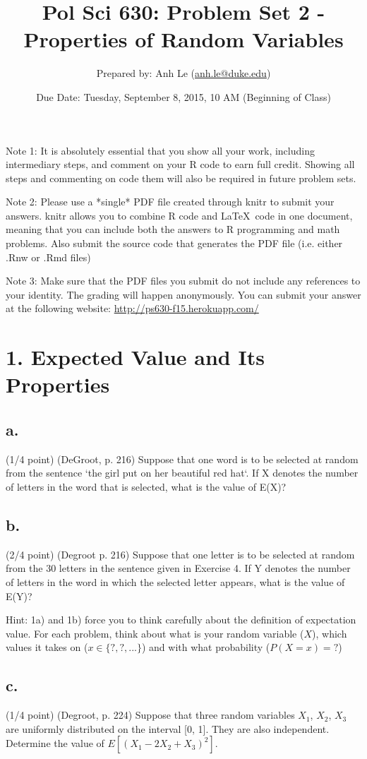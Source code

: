 \documentclass{article}\usepackage[]{graphicx}\usepackage[]{color}
\title{Pol Sci 630: Problem Set 2 - Properties of Random Variables}
\author{Prepared by: Anh Le (\href{mailto:anh.le@duke.edu}{anh.le@duke.edu})}
\date{Due Date: Tuesday, September 8, 2015, 10 AM (Beginning of Class)}
\begin{document}
\maketitle

Note 1: It is absolutely essential that you show all your work, including intermediary steps, and comment on your R code to earn full credit. Showing all steps and commenting on code them will also be required in future problem sets.

Note 2: Please use a *single* PDF file created through knitr to submit your answers. knitr allows you to combine R code and \LaTeX \ code in one document, meaning that you can include both the answers to R programming and math problems. Also submit the source code that generates the PDF file (i.e. either .Rnw or .Rmd files)

Note 3: Make sure that the PDF files you submit do not include any references to your identity. The grading will happen anonymously. You can submit your answer at the following website: \url{http://ps630-f15.herokuapp.com/}

\section*{1. Expected Value and Its Properties}

\subsection*{a.} (1/4 point) (DeGroot, p. 216) Suppose that one word is to be selected at random from the sentence `the girl put on her beautiful red hat`. If X denotes the number of letters in the word that is selected, what is the value of E(X)?

\subsection*{b.} (2/4 point) (Degroot p. 216) Suppose that one letter is to be selected at random from
the 30 letters in the sentence given in Exercise 4. If Y
denotes the number of letters in the word in which the
selected letter appears, what is the value of E(Y)?

Hint: 1a) and 1b) force you to think carefully about the definition of expectation value. For each problem, think about what is your random variable ($X$), which values it takes on ($x \in \{?, ?, ...\}$) and with what probability ($P(X = x) = ?$)

\subsection*{c.} (1/4 point) (Degroot, p. 224) Suppose that three random variables $X_1$, $X_2$, $X_3$ are uniformly distributed on the interval [0, 1]. They are also independent. Determine the value of $E[(X_1 − 2X_2 + X_3)^2]$.
\end{document}
